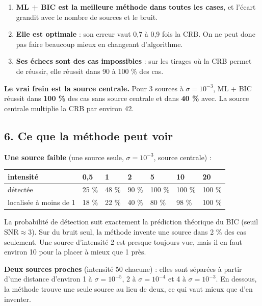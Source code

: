 \documentclass[
  french,
]{article}
\newcounter{none} %
\providecommand{\tightlist}{%
  \setlength{\itemsep}{0pt}\setlength{\parskip}{0pt}}
\begin{document}
\begin{enumerate}
\def\labelenumi{\arabic{enumi}.}
\tightlist
\item
  \textbf{ML + BIC est la meilleure méthode dans toutes les cases}, et
  l'écart grandit avec le nombre de sources et le bruit.
\item
  \textbf{Elle est optimale} : son erreur vaut 0,7 à 0,9 fois la CRB. On
  ne peut donc pas faire beaucoup mieux en changeant d'algorithme.
\item
  \textbf{Ses échecs sont des cas impossibles} : sur les tirages où la
  CRB permet de réussir, elle réussit dans 90 à 100 \% des cas.
\end{enumerate}

\textbf{Le vrai frein est la source centrale.} Pour 3 sources à
\(\sigma = 10^{-3}\), ML + BIC réussit dans \textbf{100 \%} des cas sans
source centrale et dans \textbf{40 \%} avec. La source centrale
multiplie la CRB par environ 42.

\subsection{6. Ce que la méthode peut
voir}\label{ce-que-la-muxe9thode-peut-voir}

\textbf{Une source faible} (une source seule, \(\sigma = 10^{-3}\),
source centrale) :

{\def\LTcaptype{none} %
\begin{longtable}[]{@{}lllllll@{}}
\toprule\noalign{}
intensité & 0,5 & 1 & 2 & 5 & 10 & 20 \\
\midrule\noalign{}
\endhead
\bottomrule\noalign{}
\endlastfoot
détectée & 25 \% & 48 \% & 90 \% & 100 \% & 100 \% & 100 \% \\
localisée à moins de 1 & 18 \% & 22 \% & 40 \% & 80 \% & 98 \% & 100
\% \\
\end{longtable}
}

La probabilité de détection suit exactement la prédiction théorique du
BIC (seuil \(\mathrm{SNR}\approx 3\)). Sur du bruit seul, la méthode
invente une source dans 2 \% des cas seulement. Une source d'intensité 2
est presque toujours vue, mais il en faut environ 10 pour la placer à
mieux que 1 près.

\textbf{Deux sources proches} (intensité 50 chacune) : elles sont
séparées à partir d'une distance d'environ 1 à \(\sigma = 10^{-5}\), 2 à
\(\sigma = 10^{-4}\) et 4 à \(\sigma = 10^{-3}\). En dessous, la méthode
trouve une seule source au lieu de deux, ce qui vaut mieux que d'en
inventer.
\end{document}
